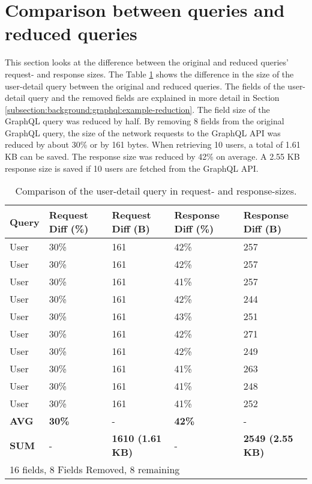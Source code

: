 \section{Comparison between queries and reduced queries}

This section looks at the difference between the original and reduced queries' request- and response sizes. The Table \ref{table:code:comparison-user-reduction} shows the difference in the size of the user-detail query between the original and reduced queries. The fields of the user-detail query and the removed fields are explained in more detail in Section \ref{subsection:background:graphql:example-reduction}.
The field size of the GraphQL query was reduced by half. By removing 8 fields from the original GraphQL query, the size of the network requests to the GraphQL \ac{API} was reduced by about 30\% or by 161 bytes. When retrieving 10 users, a total of 1.61 KB can be saved. The response size was reduced by 42\% on average. A 2.55 KB response size is saved if 10 users are fetched from the GraphQL \ac{API}.

\ifshowTables
\begin{table}[H]
  \begin{tabular}{|l|l|l|l|l|}
  \hline
  \textbf{Query} & \textbf{Request Diff (\%)} & \textbf{Request Diff (B)} & \textbf{Response Diff (\%)} & \textbf{Response Diff (B)} \\
  \hline
  User & 30\% & 161 & 42\% & 257 \\
  \hline
  User & 30\% & 161 & 42\% & 257 \\
  \hline
  User & 30\% & 161 & 41\% & 257 \\
  \hline
  User & 30\% & 161 & 42\% & 244 \\
  \hline
  User & 30\% & 161 & 43\% & 251 \\
  \hline
  User & 30\% & 161 & 42\% & 271 \\
  \hline
  User & 30\% & 161 & 42\% & 249 \\
  \hline
  User & 30\% & 161 & 41\% & 263 \\
  \hline
  User & 30\% & 161 & 41\% & 248 \\
  \hline
  User & 30\% & 161 & 41\% & 252 \\
  \hline
  \hline
  \textbf{AVG} & \textbf{30\%} & - & \textbf{42\%} & -  \\
  \hline
  \hline
  \textbf{SUM} & - & \textbf{1610 (1.61 KB)} & - & \textbf{2549 (2.55 KB)} \\
  \hline
  \multicolumn{5}{l}{16 fields, 8 Fields Removed, 8 remaining}
  \end{tabular}
  \caption{Comparison of the user-detail query in request- and response-sizes.}\label{table:code:comparison-user-reduction}
\end{table}
\fi

